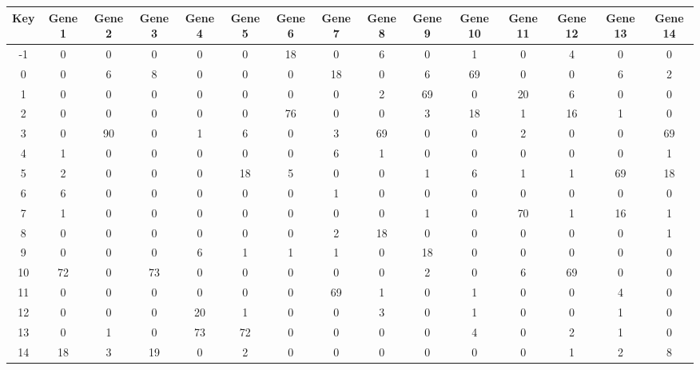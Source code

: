 \begin{tabular}{|c|c|c|c|c|c|c|c|c|c|c|c|c|c|c|}
\hline
Key & Gene 1 & Gene 2 & Gene 3 & Gene 4 & Gene 5 & Gene 6 & Gene 7 & Gene 8 & Gene 9 & Gene 10 & Gene 11 & Gene 12 & Gene 13 & Gene 14 \\
\hline
-1 & 0 & 0 & 0 & 0 & 0 & 18 & 0 & 6 & 0 & 1 & 0 & 4 & 0 & 0 \\
0 & 0 & 6 & 8 & 0 & 0 & 0 & 18 & 0 & 6 & 69 & 0 & 0 & 6 & 2 \\
1 & 0 & 0 & 0 & 0 & 0 & 0 & 0 & 2 & 69 & 0 & 20 & 6 & 0 & 0 \\
2 & 0 & 0 & 0 & 0 & 0 & 76 & 0 & 0 & 3 & 18 & 1 & 16 & 1 & 0 \\
3 & 0 & 90 & 0 & 1 & 6 & 0 & 3 & 69 & 0 & 0 & 2 & 0 & 0 & 69 \\
4 & 1 & 0 & 0 & 0 & 0 & 0 & 6 & 1 & 0 & 0 & 0 & 0 & 0 & 1 \\
5 & 2 & 0 & 0 & 0 & 18 & 5 & 0 & 0 & 1 & 6 & 1 & 1 & 69 & 18 \\
6 & 6 & 0 & 0 & 0 & 0 & 0 & 1 & 0 & 0 & 0 & 0 & 0 & 0 & 0 \\
7 & 1 & 0 & 0 & 0 & 0 & 0 & 0 & 0 & 1 & 0 & 70 & 1 & 16 & 1 \\
8 & 0 & 0 & 0 & 0 & 0 & 0 & 2 & 18 & 0 & 0 & 0 & 0 & 0 & 1 \\
9 & 0 & 0 & 0 & 6 & 1 & 1 & 1 & 0 & 18 & 0 & 0 & 0 & 0 & 0 \\
10 & 72 & 0 & 73 & 0 & 0 & 0 & 0 & 0 & 2 & 0 & 6 & 69 & 0 & 0 \\
11 & 0 & 0 & 0 & 0 & 0 & 0 & 69 & 1 & 0 & 1 & 0 & 0 & 4 & 0 \\
12 & 0 & 0 & 0 & 20 & 1 & 0 & 0 & 3 & 0 & 1 & 0 & 0 & 1 & 0 \\
13 & 0 & 1 & 0 & 73 & 72 & 0 & 0 & 0 & 0 & 4 & 0 & 2 & 1 & 0 \\
14 & 18 & 3 & 19 & 0 & 2 & 0 & 0 & 0 & 0 & 0 & 0 & 1 & 2 & 8 \\
\hline
\end{tabular}